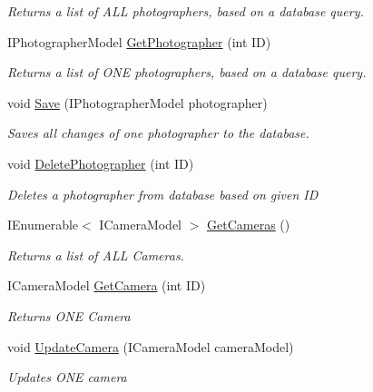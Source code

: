 \begin{DoxyCompactItemize}
\begin{DoxyCompactList}\small\item\em Returns a list of A\+LL photographers, based on a database query. \end{DoxyCompactList}\item 
I\+Photographer\+Model \mbox{\hyperlink{class_pic_d_b_1_1_layers_1_1_data_access_layer_a1a5096b0ee7c2e9c8a051af5f74ad2ec}{Get\+Photographer}} (int ID)
\begin{DoxyCompactList}\small\item\em Returns a list of O\+NE photographers, based on a database query. \end{DoxyCompactList}\item 
void \mbox{\hyperlink{class_pic_d_b_1_1_layers_1_1_data_access_layer_a4e3554f691b1aae313a9c1162ccd3bee}{Save}} (I\+Photographer\+Model photographer)
\begin{DoxyCompactList}\small\item\em Saves all changes of one photographer to the database. \end{DoxyCompactList}\item 
void \mbox{\hyperlink{class_pic_d_b_1_1_layers_1_1_data_access_layer_abbdd8f6f2145b58a3c1b084d203510f6}{Delete\+Photographer}} (int ID)
\begin{DoxyCompactList}\small\item\em Deletes a photographer from database based on given ID \end{DoxyCompactList}\item 
I\+Enumerable$<$ I\+Camera\+Model $>$ \mbox{\hyperlink{class_pic_d_b_1_1_layers_1_1_data_access_layer_a0aef35ea518e7020dfeb77b9e7f556e9}{Get\+Cameras}} ()
\begin{DoxyCompactList}\small\item\em Returns a list of A\+LL Cameras. \end{DoxyCompactList}\item 
I\+Camera\+Model \mbox{\hyperlink{class_pic_d_b_1_1_layers_1_1_data_access_layer_a58aa8e9e53b9c7fdcacb48582daf9f36}{Get\+Camera}} (int ID)
\begin{DoxyCompactList}\small\item\em Returns O\+NE Camera \end{DoxyCompactList}\item 
void \mbox{\hyperlink{class_pic_d_b_1_1_layers_1_1_data_access_layer_a1909e4d371b56f0b5d400658ed0b167b}{Update\+Camera}} (I\+Camera\+Model camera\+Model)
\begin{DoxyCompactList}\small\item\em Updates O\+NE camera \end{DoxyCompactList}\item 

\end{DoxyCompactItemize}
